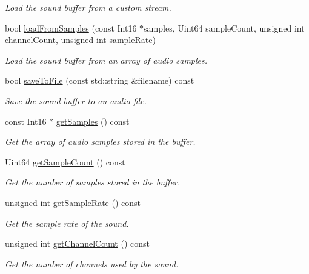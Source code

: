 \begin{DoxyCompactItemize}
\begin{DoxyCompactList}\small\item\em Load the sound buffer from a custom stream. \end{DoxyCompactList}\item 
bool \hyperlink{classsf_1_1SoundBuffer_a42d51ce4bb3b60c7ea06f63c273fd063}{load\+From\+Samples} (const Int16 $\ast$samples, Uint64 sample\+Count, unsigned int channel\+Count, unsigned int sample\+Rate)
\begin{DoxyCompactList}\small\item\em Load the sound buffer from an array of audio samples. \end{DoxyCompactList}\item 
bool \hyperlink{classsf_1_1SoundBuffer_aade64260c6375580a085314a30be007e}{save\+To\+File} (const std\+::string \&filename) const
\begin{DoxyCompactList}\small\item\em Save the sound buffer to an audio file. \end{DoxyCompactList}\item 
const Int16 $\ast$ \hyperlink{classsf_1_1SoundBuffer_ab9b2525a8da64cb266ba728aff7adecb}{get\+Samples} () const
\begin{DoxyCompactList}\small\item\em Get the array of audio samples stored in the buffer. \end{DoxyCompactList}\item 
Uint64 \hyperlink{classsf_1_1SoundBuffer_aebe2a4bdbfbd9249353748da3f6a4fa1}{get\+Sample\+Count} () const
\begin{DoxyCompactList}\small\item\em Get the number of samples stored in the buffer. \end{DoxyCompactList}\item 
unsigned int \hyperlink{classsf_1_1SoundBuffer_a2c2cf0078ce0549246ecc4a1646212b4}{get\+Sample\+Rate} () const
\begin{DoxyCompactList}\small\item\em Get the sample rate of the sound. \end{DoxyCompactList}\item 
unsigned int \hyperlink{classsf_1_1SoundBuffer_a127707b831d875ed790eef1aa2b9fcc3}{get\+Channel\+Count} () const
\begin{DoxyCompactList}\small\item\em Get the number of channels used by the sound. \end{DoxyCompactList}\item 

\end{DoxyCompactItemize}
